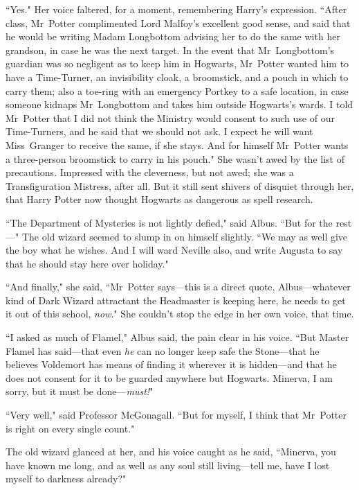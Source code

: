 ``Yes." Her voice faltered, for a moment, remembering Harry's expression. ``After class, Mr~Potter complimented Lord Malfoy's excellent good sense, and said that he would be writing Madam Longbottom advising her to do the same with her grandson, in case he was the next target. In the event that Mr~Longbottom's guardian was so negligent as to keep him in Hogwarts, Mr~Potter wanted him to have a Time-Turner, an invisibility cloak, a broomstick, and a pouch in which to carry them; also a toe-ring with an emergency Portkey to a safe location, in case someone kidnaps Mr~Longbottom and takes him outside Hogwarts's wards. I told Mr~Potter that I did not think the Ministry would consent to such use of our Time-Turners, and he said that we should not ask. I expect he will want Miss~Granger to receive the same, if she stays. And for himself Mr~Potter wants a three-person broomstick to carry in his pouch." She wasn't awed by the list of precautions. Impressed with the cleverness, but not awed; she was a Transfiguration Mistress, after all. But it still sent shivers of disquiet through her, that Harry Potter now thought Hogwarts as dangerous as spell research.

``The Department of Mysteries is not lightly defied," said Albus. ``But for the rest—" The old wizard seemed to slump in on himself slightly. ``We may as well give the boy what he wishes. And I will ward Neville also, and write Augusta to say that he should stay here over holiday."

``And finally," she said, ``Mr~Potter says—this is a direct quote, Albus—whatever kind of Dark Wizard attractant the Headmaster is keeping here, he needs to get it out of this school, \emph{now}." She couldn't stop the edge in her own voice, that time.

``I asked as much of Flamel," Albus said, the pain clear in his voice. ``But Master Flamel has said—that even \emph{he} can no longer keep safe the Stone—that he believes Voldemort has means of finding it wherever it is hidden—and that he does not consent for it to be guarded anywhere but Hogwarts. Minerva, I am sorry, but it must be done—\emph{must!}"

``Very well," said Professor McGonagall. ``But for myself, I think that Mr~Potter is right on every single count."

The old wizard glanced at her, and his voice caught as he said, ``Minerva, you have known me long, and as well as any soul still living—tell me, have I lost myself to darkness already?"

